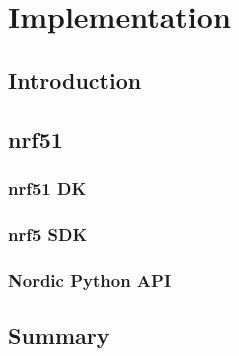 \chapter{Implementation}

    \section{Introduction}

    \section{nrf51}
      \subsection{nrf51 DK}
      \subsection{nrf5 SDK}
      \subsection{Nordic Python API}

    \section{Summary}
